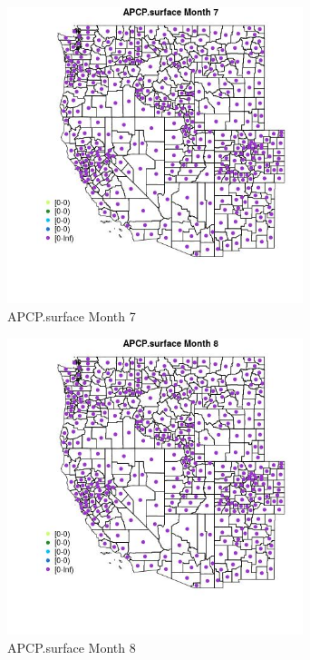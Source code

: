 \begin{figure} 
\centering  
\includegraphics[width=0.77\textwidth]{Code_Outputs/df_report_ML_predictors_CountyCentroid_Locations_Dates_2008-01-01to2018-12-31_MapObsMo7APCPsurface.jpg} 
\caption{\label{fig:df_report_ML_predictors_CountyCentroid_Locations_Dates_2008-01-01to2018-12-31MapObsMo7APCPsurface}APCP.surface Month 7} 
\end{figure} 
 

\begin{figure} 
\centering  
\includegraphics[width=0.77\textwidth]{Code_Outputs/df_report_ML_predictors_CountyCentroid_Locations_Dates_2008-01-01to2018-12-31_MapObsMo8APCPsurface.jpg} 
\caption{\label{fig:df_report_ML_predictors_CountyCentroid_Locations_Dates_2008-01-01to2018-12-31MapObsMo8APCPsurface}APCP.surface Month 8} 
\end{figure} 
 

